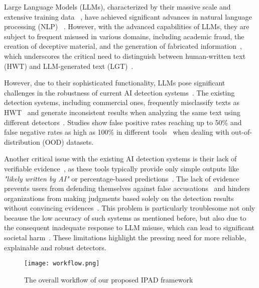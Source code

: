 Large Language Models (LLMs), characterized by their massive scale and extensive training data ~\cite{r1}, have achieved significant advances in natural language processing (NLP) ~\cite{r10,r11,r12}. However, with the advanced capabilities of LLMs, they are subject to frequent misused in various domains, including academic fraud, the creation of deceptive material, and the generation of fabricated information~\cite{r13,r14,r15}, which underscores the critical need to distinguish between human-written text (HWT) and LLM-generated text (LGT)~\cite{r14,r18,r19}.

However, due to their sophisticated functionality, LLMs pose significant challenges in the robustness of current AI detection systems~\cite{r12}. The existing detection systems, including commercial ones, frequently misclassify texts as HWT~\cite{r20,r21} and generate inconsistent results when analyzing the same text using different detectors~\cite{r22,r23}. Studies show false positive rates reaching up to 50\% and false negative rates as high as 100\% in different tools~\cite{r23} when dealing with out-of-distribution (OOD) datasets.

Another critical issue with the existing AI detection systems is their lack of verifiable evidence~\cite{r24}, as these tools typically provide only simple outputs like \textit{"likely written by AI"} or percentage-based predictions~\cite{r23}. The lack of evidence prevents users from defending themselves against false accusations~\cite{r22} and hinders organizations from making judgments based solely on the detection results without convincing evidences~\cite{r23}. This problem is particularly troublesome not only because the low accuracy of such systems as mentioned before, but also due to the consequent inadequate response to LLM misuse, which can lead to significant societal harm~\cite{r25,r26,r27,r12}. These limitations highlight the pressing need for more reliable, explainable and robust detectors.

\begin{figure*}[t]
  \centering
  \texttt{[image: workflow.png]}
  \caption{The overall workflow of our proposed IPAD framework}
  \label{fig:workflow}
\end{figure*}

